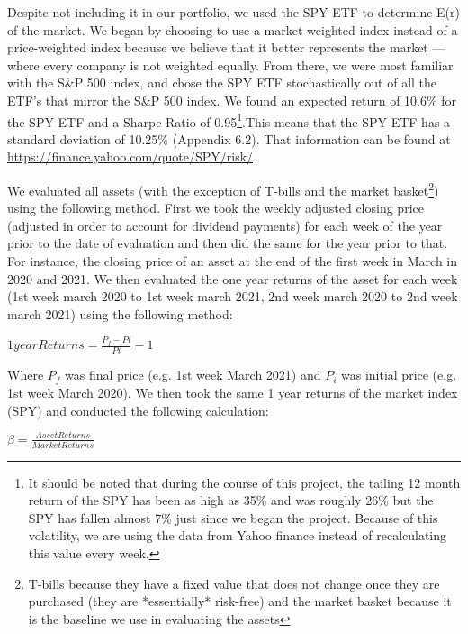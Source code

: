 \documentclass{article}
\begin{document}
Despite not including it in our portfolio, we used the SPY ETF to determine E(r) of the market. We began by choosing to use a market-weighted index instead of a price-weighted index because we believe that it better represents the market — where every company is not weighted equally. From there, we were most familiar with the S\&P 500 index, and chose the SPY ETF stochastically out of all the ETF's that mirror the S\&P 500 index. We found an expected return of 10.6\% for the SPY ETF and a Sharpe Ratio of 0.95\footnote{It should be noted that during the course of this project, the tailing 12 month return of the SPY has been as high as 35\% and was roughly 26\% but the SPY has fallen almost 7\% just since we began the project. Because of this volatility, we are using the data from Yahoo finance instead of recalculating this value every week.}.This means that the SPY ETF has a standard deviation of 10.25\% (Appendix 6.2). That information can be found at \url{https://finance.yahoo.com/quote/SPY/risk/}.

We evaluated all assets (with the exception of T-bills and the market basket\footnote{T-bills because they have a fixed value that does not change once they are purchased (they are *essentially* risk-free) and the market basket because it is the baseline we use in evaluating the assets}) using the following method. First we took the weekly adjusted closing price (adjusted in order to account for dividend payments) for each week of the year prior to the date of evaluation and then did the same for the year prior to that. For instance, the closing price of an asset at the end of the first week in March in 2020 and 2021. We then evaluated the one year returns of the asset for each week (1st week march 2020 to 1st week march 2021, 2nd week march 2020 to 2nd week march 2021) using the following method:

\begin{center}
    \begin{math}
        1 year Returns = \frac{P_{f}-P{i}}{P{i}} -1
    \end{math}
\end{center}

\noindent Where $P_{f}$ was final price (e.g. 1st week March 2021) and $P_{i}$ was initial price (e.g. 1st week March 2020). We then took the same 1 year returns of the market index (SPY) and conducted the following calculation:

\begin{center}
\begin{math}
    \beta = \frac{Asset Returns}{Market Returns}
\end{math}
\end{center}
\end{document}
